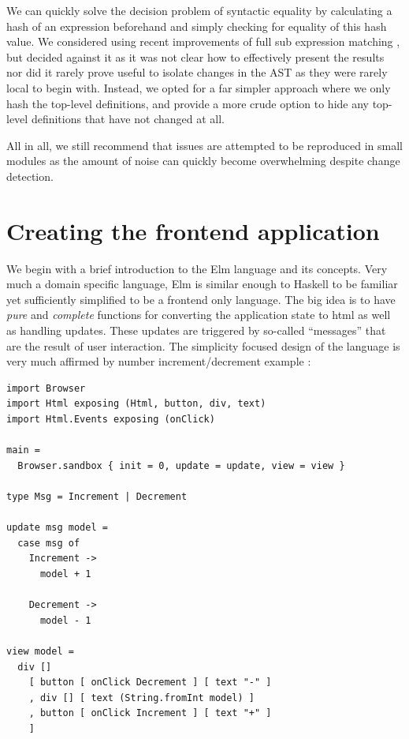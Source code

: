 We can quickly solve the decision problem of syntactic equality by calculating a hash of an expression beforehand
and simply checking for equality of this hash value. We considered using recent improvements of full sub expression
matching \cite{hashing_mod_alpha}, but decided against it as it was not clear how to effectively present the results
nor did it rarely prove useful to isolate changes in the AST as they were rarely local to begin with.
Instead, we opted for a far simpler approach where we only hash the top-level definitions, and provide a more crude
option to hide any top-level definitions that have not changed at all.

All in all, we still recommend that issues are attempted to be reproduced in small modules as the amount of
noise can quickly become overwhelming despite change detection.

\section{Creating the frontend application}

We begin with a brief introduction to the Elm language and its concepts. Very much a domain specific language, Elm is 
similar enough to Haskell to be familiar yet sufficiently simplified to be a frontend only language. The big idea is
to have \textit{pure} and \textit{complete} functions for converting the application state to html as well as handling
updates. These updates are triggered by so-called ``messages'' that are the result of user interaction. The simplicity
focused design of the language is very much affirmed by number increment/decrement example \cite{elm_lang}:

\begin{listing}[H]
\begin{verbatim}
import Browser
import Html exposing (Html, button, div, text)
import Html.Events exposing (onClick)

main =
  Browser.sandbox { init = 0, update = update, view = view }

type Msg = Increment | Decrement

update msg model =
  case msg of
    Increment ->
      model + 1

    Decrement ->
      model - 1

view model =
  div []
    [ button [ onClick Decrement ] [ text "-" ]
    , div [] [ text (String.fromInt model) ]
    , button [ onClick Increment ] [ text "+" ]
    ]
\end{verbatim}
\end{listing}

